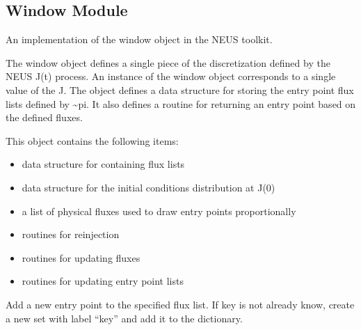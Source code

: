 \documentclass[letterpaper,10pt,english]{sphinxmanual}
\begin{document}
\subsection{Window Module}
\label{applications/applications.doc:module-window}\label{applications/applications.doc:window-module}
An implementation of the window object in the NEUS toolkit.

\begin{fulllineitems}
\label{applications/applications.doc:window.window}
The window object defines a single piece of the discretization defined by the NEUS J(t) process. An instance of the window object corresponds to a single value of the J. The object defines a data structure for storing the entry point flux lists defined by \textasciitilde{}pi. It also defines a routine for returning an entry point based on the defined fluxes.

This object contains the following items:
\begin{itemize}
\item {} 
data structure for containing flux lists

\item {} 
data structure for the initial conditions distribution at J(0)

\item {} 
a list of physical fluxes used to draw entry points proportionally

\item {} 
routines for reinjection

\item {} 
routines for updating fluxes

\item {} 
routines for updating entry point lists

\end{itemize}

\begin{fulllineitems}
\label{applications/applications.doc:window.window.add_entry_point}
Add a new entry point to the specified flux list. If key is not already know, create a new set with label ``key'' and add it to the dictionary.


\end{fulllineitems}
\end{fulllineitems}
\end{document}

